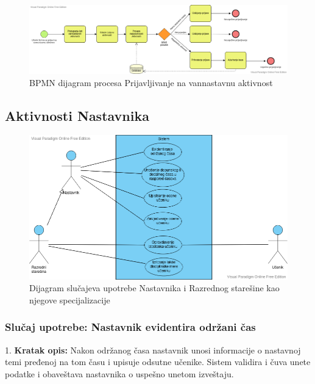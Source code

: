 \documentclass{article}
\begin{document}
\begin{figure} [!ht]
    \begin{center}
        \includegraphics[scale=0.34]{imgs/BPMN_prijava_na_aktivnost.png}
    \end{center}
\caption{BPMN dijagram procesa Prijavljivanje na vannastavnu aktivnost}
\end{figure}


\newpage
\subsection{Aktivnosti Nastavnika}

\begin{figure} [!ht]
    \begin{center}
        \includegraphics[scale=0.45]{imgs/nastavnik_use_case.png}
    \end{center}
\caption{Dijagram slučajeva upotrebe Nastavnika i Razrednog starešine kao njegove specijalizacije}
\end{figure}

\newpage
\subsubsection{Slučaj upotrebe: Nastavnik evidentira održani čas} 
1. \textbf{Kratak opis:} Nakon održanog časa nastavnik unosi informacije o nastavnoj temi pređenoj na tom času i upisuje odsutne učenike. Sistem validira i čuva unete podatke i obaveštava nastavnika o uspešno unetom izveštaju.\\
\end{document}
